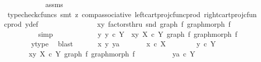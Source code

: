 \begin{isabellebody}
\ \ \ \ \ \ \ \ \ \ \isamarkupfalse%
\ assms\ \ \isanewline
\ \ \ \ \ \ \ \ \ \ \isamarkupfalse%
\ {\isacharparenleft}{\kern0pt}typecheck{\isacharunderscore}{\kern0pt}cfuncs{\isacharcomma}{\kern0pt}\ smt\ {\isacharparenleft}{\kern0pt}z{}{\isacharparenright}{\kern0pt}\ comp{\isacharunderscore}{\kern0pt}associative{}\ left{\isacharunderscore}{\kern0pt}cart{\isacharunderscore}{\kern0pt}proj{\isacharunderscore}{\kern0pt}cfunc{\isacharunderscore}{\kern0pt}prod\ right{\isacharunderscore}{\kern0pt}cart{\isacharunderscore}{\kern0pt}proj{\isacharunderscore}{\kern0pt}cfunc{\isacharunderscore}{\kern0pt}prod\ y{\isacharunderscore}{\kern0pt}def{\isacharparenright}{\kern0pt}\isanewline
\ \ \ \ \ \ \isamarkupfalse%
\isanewline
\ \ \ \ \ \ \isamarkupfalse%
\ \isamarkupfalse%
\ {\isachardoublequoteopen}{\isasymlangle}x{\isacharcomma}{\kern0pt}y{\isasymrangle}\ factorsthru\ snd\ {\isacharparenleft}{\kern0pt}graph\ f{\isacharcomma}{\kern0pt}\ graph{\isacharunderscore}{\kern0pt}morph\ f{\isacharparenright}{\kern0pt}{\isachardoublequoteclose}\isanewline
\ \ \ \ \ \ \ \ \isamarkupfalse%
\ simp\isanewline
\ \ \ \ \isamarkupfalse%
\isanewline
\ \ \ \ \isamarkupfalse%
\ \isamarkupfalse%
\ {\isachardoublequoteopen}{\isasymexists}y{\isachardot}{\kern0pt}\ y\ {\isasymin}\isactrlsub c\ Y\ {\isasymand}\ {\isasymlangle}x{\isacharcomma}{\kern0pt}y{\isasymrangle}\ {\isasymin}\isactrlbsub X\ {\isasymtimes}\isactrlsub c\ Y\isactrlesub \ {\isacharparenleft}{\kern0pt}graph\ f{\isacharcomma}{\kern0pt}\ graph{\isacharunderscore}{\kern0pt}morph\ f{\isacharparenright}{\kern0pt}{\isachardoublequoteclose}\isanewline
\ \ \ \ \ \ \isamarkupfalse%
\ y{\isacharunderscore}{\kern0pt}type\ \isamarkupfalse%
\ blast\isanewline
\ \ \isamarkupfalse%
\isanewline
\ \ \isamarkupfalse%
\ {\isachardoublequoteopen}{\isasymAnd}x\ y\ ya{\isachardot}{\kern0pt}\isanewline
\ \ \ \ \ \ \ x\ {\isasymin}\isactrlsub c\ X\ {\isasymLongrightarrow}\isanewline
\ \ \ \ \ \ \ y\ {\isasymin}\isactrlsub c\ Y\ {\isasymLongrightarrow}\isanewline
\ \ \ \ \ \ \ {\isasymlangle}x{\isacharcomma}{\kern0pt}y{\isasymrangle}\ {\isasymin}\isactrlbsub X\ {\isasymtimes}\isactrlsub c\ Y\isactrlesub \ {\isacharparenleft}{\kern0pt}graph\ f{\isacharcomma}{\kern0pt}\ graph{\isacharunderscore}{\kern0pt}morph\ f{\isacharparenright}{\kern0pt}\ {\isasymLongrightarrow}\ \isanewline
\ \ \ \ \ \ \ \ ya\ {\isasymin}\isactrlsub c\ Y\ {\isasymLongrightarrow}\ \isanewline

\end{isabellebody}
